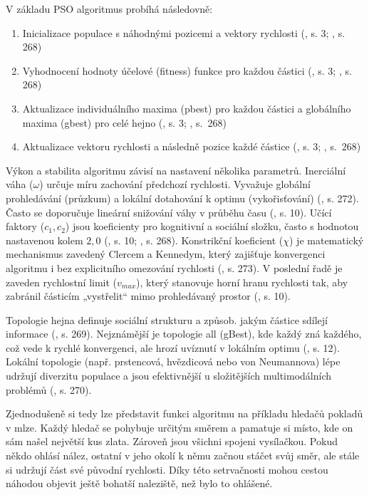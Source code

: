 \documentclass[a4paper, twoside, 12pt, czech]{article}
\begin{document}
V základu PSO algoritmus probíhá následovně:
\begin{enumerate}
    \item Inicializace populace s náhodnými pozicemi a vektory rychlosti (\cite{pso-overview}, s. 3; \cite{evolutionaryOptimizationAlgos}, s. 268)
    \item Vyhodnocení hodnoty účelové (fitness) funkce pro každou částici (\cite{pso-overview}, s. 3; \cite{evolutionaryOptimizationAlgos}, s. 268)
    \item Aktualizace individuálního maxima (pbest) pro každou částici a 
    globálního maxima (gbest) pro celé hejno (\cite{pso-overview}, s. 3; \cite{evolutionaryOptimizationAlgos}, s.~268)
    \item Aktualizace vektoru rychlosti a následně pozice každé částice (\cite{pso-overview}, s. 3; \cite{evolutionaryOptimizationAlgos}, s.~268)
\end{enumerate}

Výkon a stabilita algoritmu závisí na nastavení několika parametrů. Inerciální 
váha ($\omega$) určuje míru zachování předchozí rychlosti. Vyvažuje globální 
prohledá\-vání (průzkum) a lokální dotahování k optimu (vykořisťování) (\cite{evolutionaryOptimizationAlgos}, s. 272). Často se 
doporučuje lineární snižování váhy v průběhu času (\cite{pso-overview}, s. 10).
Učící faktory ($c_1, c_2$) jsou koeficienty pro kognitivní a sociální složku, 
často s hodnotou nastavenou kolem $2,0$ (\cite{pso-overview}, s. 10; \cite{evolutionaryOptimizationAlgos}, s. 268).
Konstrikční koeficient ($\chi$) je matematický mechanismus zavedený Clercem a 
Kennedym, který zajišťuje konvergenci algoritmu i bez explicitního omezování 
rychlosti (\cite{evolutionaryOptimizationAlgos}, s. 273).
V poslední řadě je zaveden rychlostní limit ($v_{max}$), který stanovuje horní 
hranu rychlosti tak, aby zabránil částicím „vystřelit“ mimo prohledávaný prostor (\cite{pso-overview}, s. 10).

Topologie hejna definuje sociální strukturu a způsob. jakým částice sdílejí 
informace (\cite{evolutionaryOptimizationAlgos}, s. 269).  Nejznámější je topologie all (gBest), kde každý zná každého, což 
vede k rychlé konvergenci, ale hrozí uvíznutí v lokálním optimu (\cite{pso-overview}, s. 12). Lokální 
topologie (např. prstencová, hvězdicová nebo von Neumannova) lépe udržují 
diverzitu populace a jsou efektivnější u složitějších multimodálních prob\-lémů (\cite{evolutionaryOptimizationAlgos}, s. 270).

Zjednodušeně si tedy lze představit funkci algoritmu na příkladu hledačů pokladů 
v mlze. Každý hledač se pohybuje určitým směrem a pamatuje si místo, kde on sám 
našel největší kus zlata. Zároveň jsou všichni spojeni vysílačkou. Pokud někdo 
ohlásí nález, ostatní v jeho okolí k němu začnou stáčet svůj směr, ale stále si 
udržují část své původní rychlosti. Díky této setrvačnosti mohou cestou náhodou 
objevit ještě bohatší naleziště, než bylo to ohlášené.
\end{document}
